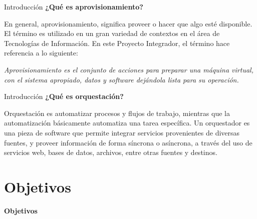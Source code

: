 \begin{frame}{Introducción}
    \vspace{-2.0cm}
    \textbf{¿Qué es aprovisionamiento?}

    En general, aprovisionamiento, significa proveer o hacer que algo esté disponible. El término es utilizado en un gran variedad de contextos en el área de Tecnologías de Información. En este Proyecto Integrador, el término hace referencia a lo siguiente:

    \begin{block}{}
    \textit
    {
        Aprovisionamiento es el conjunto de acciones para preparar una máquina virtual, con el sistema apropiado, datos y software dejándola lista para su operación.
    }
    \end{block}

\end{frame}

\begin{frame}{Introducción}
    \vspace{-2.5cm}
    \textbf{¿Qué es orquestación?}

    Orquestación es automatizar procesos y flujos de trabajo, mientras que la automatización básicamente automatiza una tarea específica.
    Un orquestador es una pieza de software que permite integrar servicios provenientes de diversas fuentes, y proveer información de forma síncrona o asíncrona, a través del uso de servicios web, bases de datos, archivos, entre otras fuentes y destinos.

\end{frame}
\section{Objetivos}

\begin{frame}
    \Huge
    \centering
    \textbf{Objetivos}

\end{frame}

